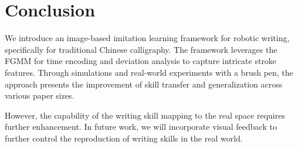 \documentclass[conference]{IEEEtran}
\begin{document}
\section{Conclusion}
We introduce an image-based imitation learning framework for robotic writing, specifically for traditional Chinese calligraphy. The framework leverages the FGMM for time encoding and deviation analysis to capture intricate stroke features. Through simulations and real-world experiments with a brush pen, the approach presents the improvement of skill transfer and generalization across various paper sizes. 

However, the capability of the writing skill mapping to the real space requires further enhancement. In future work, we will incorporate visual feedback to further control the reproduction of writing skills in the real world.



\end{document}
